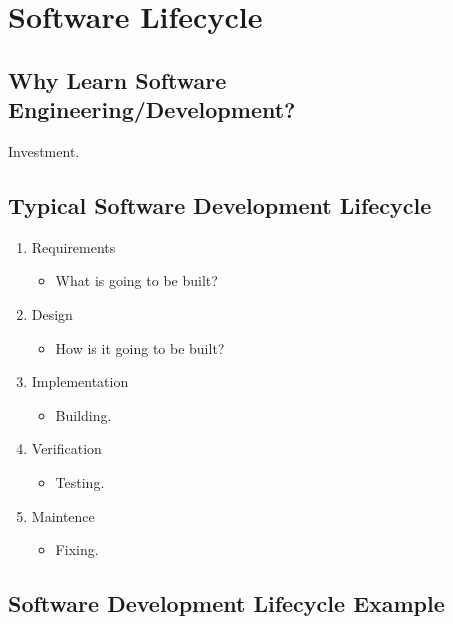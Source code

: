 \section{Software Lifecycle}

    \subsection{Why Learn Software Engineering/Development?}

        Investment.

    \subsection{Typical Software Development Lifecycle}

        \begin{enumerate}
            \item Requirements
                \begin{itemize}
                    \item What is going to be built?
                \end{itemize}
            \item Design
                \begin{itemize}
                    \item How is it going to be built?
                \end{itemize}
            \item Implementation
                \begin{itemize}
                    \item Building.
                \end{itemize}
            \item Verification
                \begin{itemize}
                    \item Testing.
                \end{itemize}
            \item Maintence
                \begin{itemize}
                    \item Fixing.
                \end{itemize}
        \end{enumerate}

    \subsection{Software Development Lifecycle Example}

